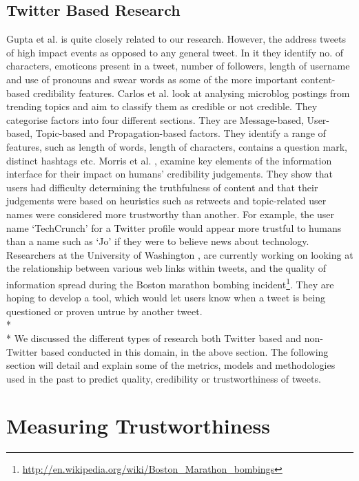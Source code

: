 \subsection{Twitter Based Research}
Gupta et al. \cite{11} is quite closely related to our research. However, the address tweets of high impact events as opposed to any general tweet. In it they identify no. of characters, emoticons present in a tweet, number of followers, length of username and use of pronouns and swear words as some of the more important content-based credibility features. Carlos et al. \cite{12} look at analysing microblog postings from trending topics and aim to classify them as credible or not credible. They categorise factors into four different sections. They are Message-based, User-based, Topic-based and Propagation-based factors. They identify a range of features, such as length of words, length of characters, contains a question mark, distinct hashtags etc. Morris et al. \cite{17}, examine key elements of the information interface for their impact on humans' credibility judgements. They show that users had difficulty determining the truthfulness of content and that their judgements were based on heuristics such as retweets and topic-related user names were considered more trustworthy than another. For example, the user name `TechCrunch' for a Twitter profile would appear more trustful to humans than a name such as `Jo' if they were to believe news about technology. Researchers at the University of Washington \cite{43}, are currently working on looking at the relationship between various web links within tweets, and the quality of information spread during the Boston marathon bombing incident\footnote{\url{http://en.wikipedia.org/wiki/Boston_Marathon_bombings}}. They are hoping to develop a tool, which would let users know when a tweet is being questioned or proven untrue by another tweet. \\*\\*
We discussed the different types of research both Twitter based and non-Twitter based conducted in this domain, in the above section. The following section will detail and explain some of the metrics, models and methodologies used in the past to predict quality, credibility or trustworthiness of tweets. 
\section{Measuring Trustworthiness}
